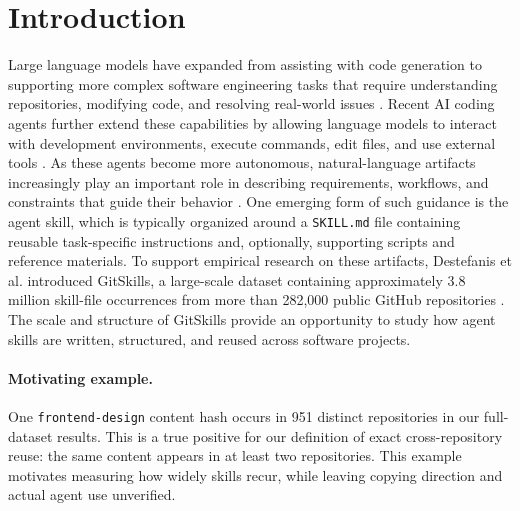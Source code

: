 \documentclass[sigconf,review]{acmart}
\begin{document}

\maketitle

\section{Introduction}
\label{Section:Introduction}
Large language models have expanded from assisting with code generation to supporting more complex software engineering tasks that require understanding repositories, modifying code, and resolving real-world issues \cite{jimenez2024swebench}. Recent AI coding agents further extend these capabilities by allowing language models to interact with development environments, execute commands, edit files, and use external tools \cite{yang2024sweagent,wang2024openhands}. As these agents become more autonomous, natural-language artifacts increasingly play an important role in describing requirements, workflows, and constraints that guide their behavior \cite{agarwal2026specmine}. One emerging form of such guidance is the agent skill, which is typically organized around a \texttt{SKILL.md} file containing reusable task-specific instructions and, optionally, supporting scripts and reference materials. To support empirical research on these artifacts, Destefanis et al. introduced GitSkills, a large-scale dataset containing approximately 3.8 million skill-file occurrences from more than 282,000 public GitHub repositories \cite{destefanis2026gitskills}. The scale and structure of GitSkills provide an opportunity to study how agent skills are written, structured, and reused across software projects.



\paragraph{Motivating example.}
One \texttt{frontend-design} content hash occurs in 951 distinct
repositories in our full-dataset results. This is a true positive
for our definition of exact cross-repository reuse: the same
content appears in at least two repositories. This example
motivates measuring how widely skills recur, while leaving
copying direction and actual agent use unverified.
\end{document}
